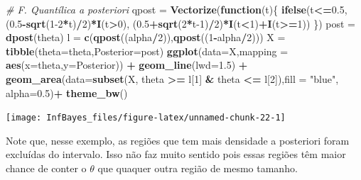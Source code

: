 \documentclass[
]{book}
\newenvironment{Shaded}{\begin{snugshade}}{\end{snugshade}}
\newcommand{\CommentTok}[1]{\textcolor[rgb]{0.56,0.35,0.01}{\textit{#1}}}
\newcommand{\ControlFlowTok}[1]{\textcolor[rgb]{0.13,0.29,0.53}{\textbf{#1}}}
\newcommand{\DataTypeTok}[1]{\textcolor[rgb]{0.13,0.29,0.53}{#1}}
\newcommand{\DecValTok}[1]{\textcolor[rgb]{0.00,0.00,0.81}{#1}}
\newcommand{\FloatTok}[1]{\textcolor[rgb]{0.00,0.00,0.81}{#1}}
\newcommand{\KeywordTok}[1]{\textcolor[rgb]{0.13,0.29,0.53}{\textbf{#1}}}
\newcommand{\NormalTok}[1]{#1}
\newcommand{\OperatorTok}[1]{\textcolor[rgb]{0.81,0.36,0.00}{\textbf{#1}}}
\newcommand{\StringTok}[1]{\textcolor[rgb]{0.31,0.60,0.02}{#1}}
\begin{document}
\begin{Shaded}
\begin{Highlighting}[]
\CommentTok{# F. Quantílica a posteriori}
\NormalTok{qpost =}\StringTok{ }\KeywordTok{Vectorize}\NormalTok{(}\ControlFlowTok{function}\NormalTok{(t)\{ }\KeywordTok{ifelse}\NormalTok{(t}\OperatorTok{<=}\FloatTok{0.5}\NormalTok{, (}\FloatTok{0.5}\OperatorTok{-}\KeywordTok{sqrt}\NormalTok{(}\DecValTok{1-2}\OperatorTok{*}\NormalTok{t)}\OperatorTok{/}\DecValTok{2}\NormalTok{)}\OperatorTok{*}\KeywordTok{I}\NormalTok{(t}\OperatorTok{>}\DecValTok{0}\NormalTok{),}
\NormalTok{    (}\FloatTok{0.5}\OperatorTok{+}\KeywordTok{sqrt}\NormalTok{(}\DecValTok{2}\OperatorTok{*}\NormalTok{t}\DecValTok{-1}\NormalTok{)}\OperatorTok{/}\DecValTok{2}\NormalTok{)}\OperatorTok{*}\KeywordTok{I}\NormalTok{(t}\OperatorTok{<}\DecValTok{1}\NormalTok{)}\OperatorTok{+}\KeywordTok{I}\NormalTok{(t}\OperatorTok{>=}\DecValTok{1}\NormalTok{)) \})}
\NormalTok{post =}\StringTok{ }\KeywordTok{dpost}\NormalTok{(theta)}
\NormalTok{l =}\StringTok{ }\KeywordTok{c}\NormalTok{(}\KeywordTok{qpost}\NormalTok{((alpha}\OperatorTok{/}\DecValTok{2}\NormalTok{)),}\KeywordTok{qpost}\NormalTok{((}\DecValTok{1}\OperatorTok{-}\NormalTok{alpha}\OperatorTok{/}\DecValTok{2}\NormalTok{)))}
\NormalTok{X =}\StringTok{ }\KeywordTok{tibble}\NormalTok{(}\DataTypeTok{theta=}\NormalTok{theta,}\DataTypeTok{Posterior=}\NormalTok{post)}
\KeywordTok{ggplot}\NormalTok{(}\DataTypeTok{data=}\NormalTok{X,}\DataTypeTok{mapping =} \KeywordTok{aes}\NormalTok{(}\DataTypeTok{x=}\NormalTok{theta,}\DataTypeTok{y=}\NormalTok{Posterior)) }\OperatorTok{+}
\StringTok{  }\KeywordTok{geom_line}\NormalTok{(}\DataTypeTok{lwd=}\FloatTok{1.5}\NormalTok{) }\OperatorTok{+}
\StringTok{  }\KeywordTok{geom_area}\NormalTok{(}\DataTypeTok{data=}\KeywordTok{subset}\NormalTok{(X, theta }\OperatorTok{>=}\StringTok{ }\NormalTok{l[}\DecValTok{1}\NormalTok{] }\OperatorTok{&}\StringTok{ }\NormalTok{theta }\OperatorTok{<=}\StringTok{ }\NormalTok{l[}\DecValTok{2}\NormalTok{]),}\DataTypeTok{fill =} \StringTok{"blue"}\NormalTok{, }\DataTypeTok{alpha=}\FloatTok{0.5}\NormalTok{)}\OperatorTok{+}
\StringTok{  }\KeywordTok{theme_bw}\NormalTok{()}
\end{Highlighting}
\end{Shaded}

\begin{center}\texttt{[image: InfBayes\_files/figure-latex/unnamed-chunk-22-1]} \end{center}

Note que, nesse exemplo, as regiões que tem mais densidade a posteriori foram excluídas do intervalo. Isso não faz muito sentido pois essas regiões têm maior chance de conter o \(\theta\) que quaquer outra região de mesmo tamanho.
\end{document}
